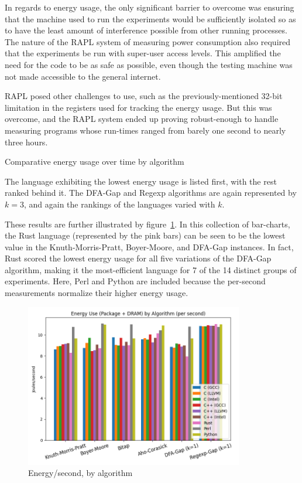 In regards to energy usage, the only significant barrier to overcome was ensuring that the machine used to run the experiments would be sufficiently isolated so as to have the least amount of interference possible from other running processes. The nature of the RAPL system of measuring power consumption also required that the experiments be run with super-user access levels. This amplified the need for the code to be as safe as possible, even though the testing machine was not made accessible to the general internet.

RAPL posed other challenges to use, such as the previously-mentioned 32-bit limitation in the registers used for tracking the energy usage. But this was overcome, and the RAPL system ended up proving robust-enough to handle measuring programs whose run-times ranged from barely one second to nearly three hours.

\begin{table}[!htb]

\caption{Comparative energy usage over time by algorithm}
\label{table:energy:comparative-algorithm}
\end{table}

The language exhibiting the lowest energy usage is listed first, with the rest ranked behind it. The DFA-Gap and Regexp algorithms are again represented by $k=3$, and again the rankings of the languages varied with $k$.

These results are further illustrated by figure~\ref{fig:graph:power_per_sec}. In this collection of bar-charts, the Rust language (represented by the pink bars) can be seen to be the lowest value in the Knuth-Morris-Pratt, Boyer-Moore, and DFA-Gap instances. In fact, Rust scored the lowest energy usage for all five variations of the DFA-Gap algorithm, making it the most-efficient language for 7 of the 14 distinct groups of experiments. Here, Perl and Python are included because the per-second measurements normalize their higher energy usage.

\begin{figure}[h]
	\centering
    \includegraphics[width=0.85\textwidth]{figures/power_per_sec.png}
    \caption{Energy/second, by algorithm}
    \label{fig:graph:power_per_sec}
\end{figure}

